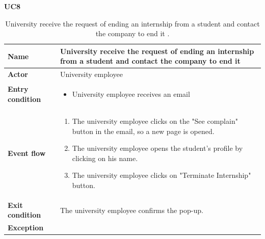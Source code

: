     \textbf{UC8}
    \nopagebreak
    \begin{table}[H]
        \centering
        \begin{tabular}{|l|p{11.9cm}|}
        \hline
        \textbf{Name}            & University receive the request of ending an internship from a student and contact the company to end it \\\hline
        \textbf{Actor}           & University employee     \\\hline
        \textbf{Entry condition} &
        \begin{itemize}
              \item University employee receives an email 
        \end{itemize}                                        \\\hline
        \textbf{Event flow}      &
        \begin{enumerate}[label=\arabic*.]
              \item The university employee clicks on the "See complain" button in the email, so a new page is opened.
              \item The university employee opens the student's profile by clicking on his name.
              \item The university employee clicks on "Terminate Internship" button.
              
        \end{enumerate}            \\\hline
        \textbf{Exit condition}  & The university employee confirms the pop-up.  \\\hline
        \textbf{Exception}       &    \\\hline
        \end{tabular}
        \caption{University receive the request of ending an internship from a student and contact the company to end it .}
        \label{table:University receive the request of ending an internship from a student and contact the company to end it }
    \end{table}

